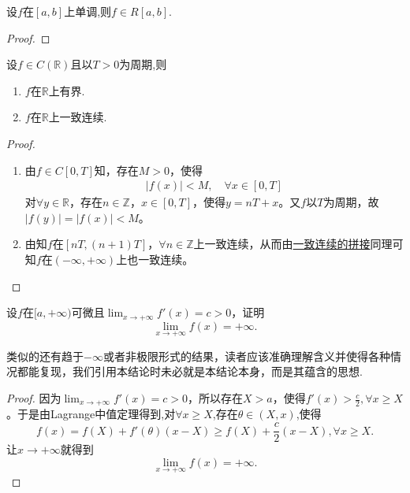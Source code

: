 \documentclass[../../main.tex]{subfiles}
\begin{document}
\begin{theorem}[闭区间上单调函数必可积]\label{theorem:闭区间上单调函数必可积}
设$f$在$[a,b]$上单调,则$f\in R[a,b].$
\end{theorem}
\begin{proof}


\end{proof}

\begin{proposition}[连续的周期函数的基本性质]\label{proposition:连续的周期函数的基本性质}
设$f\in C(\mathbb{R})$且以$T>0$为周期,则
\begin{enumerate}[(1)]
\item $f$在$\mathbb{R}$上有界.

\item $f$在$\mathbb{R}$上一致连续.
\end{enumerate}
\end{proposition}
\begin{proof}
\begin{enumerate}[(1)]
\item 由$f\in C\left[ 0,T \right]$知，存在$M>0$，使得
\begin{align*}
\left| f\left( x \right) \right|<M,\quad \forall x\in \left[ 0,T \right]
\end{align*}
对$\forall y\in \mathbb{R}$，存在$n\in \mathbb{Z}$，$x\in \left[ 0,T \right]$，使得$y=nT+x$。又$f$以$T$为周期，故$\left| f\left( y \right) \right|=\left| f\left( x \right) \right|<M$。

\item 由知$f$在$\left[ nT,\left( n+1 \right) T \right]$，$\forall n\in \mathbb{Z}$上一致连续，从而由\hyperref[proposition:一致连续函数的拼接]{一致连续的拼接}同理可知$f$在$\left( -\infty ,+\infty \right)$上也一致连续。
\end{enumerate}

\end{proof}

\begin{proposition}[导数有正增长率则函数爆炸]\label{proposition:导数有正增长率则函数爆炸}
设\(f\)在\([a,+\infty)\)可微且\(\lim_{x\rightarrow +\infty}f'(x)=c > 0\)，证明
\[\lim_{x\rightarrow +\infty}f(x)=+\infty.\]
\end{proposition}
\begin{note}
类似的还有趋于\(-\infty\)或者非极限形式的结果，读者应该准确理解含义并使得各种情况都能复现，我们引用本结论时未必就是本结论本身，而是其蕴含的思想.
\end{note}
\begin{proof}
因为\(\lim_{x\rightarrow +\infty}f'(x)=c > 0\)，所以存在\(X > a\)，使得\(f'(x)>\frac{c}{2},\forall x\geqslant X\)。于是由Lagrange中值定理得到,对$\forall x\geqslant X$,存在$\theta \in (X,x)$,使得
\[f(x)=f(X)+f'(\theta)(x - X)\geqslant f(X)+\frac{c}{2}(x - X),\forall x\geqslant X.\]
让\(x\rightarrow +\infty\)就得到
\[\lim_{x\rightarrow +\infty}f(x)=+\infty.\]

\end{proof}
\end{document}

